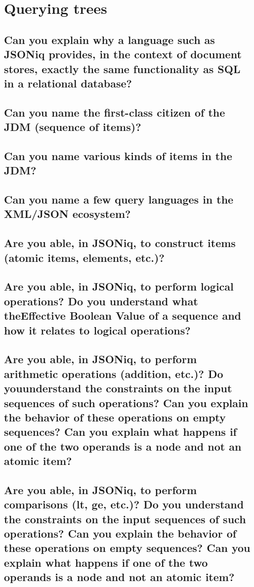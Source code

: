 \documentclass{article}
\begin{document}
\pagebreak

\section{Querying trees}
\subsection{Can you explain why a language such as JSONiq provides, in the context of document stores, exactly the same functionality as SQL in a relational database?}
\subsection{Can you name the first-class citizen of the JDM (sequence of items)?}
\subsection{Can you name various kinds of items in the JDM?}
\subsection{Can you name a few query languages in the XML/JSON ecosystem?}
\subsection{Are you able, in JSONiq, to construct items (atomic items, elements, etc.)?}
\subsection{Are you able, in JSONiq, to perform logical operations? Do you understand what theEffective Boolean Value of a sequence and how it relates to logical operations?}
\subsection{Are you able, in JSONiq, to perform arithmetic operations (addition, etc.)? Do youunderstand the constraints on the input sequences of such operations? Can you explain the behavior of these operations on empty sequences? Can you explain what happens if one of the two operands is a node and not an atomic item?}
\subsection{Are you able, in JSONiq, to perform comparisons (lt, ge, etc.)? Do you understand the constraints on the input sequences of such operations? Can you explain the behavior of these operations on empty sequences? Can you explain what happens if one of the two operands is a node and not an atomic item?}
\end{document}
